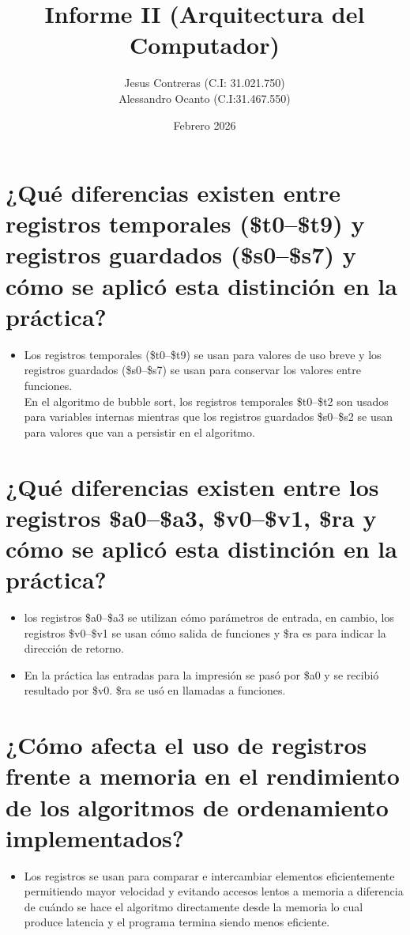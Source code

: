 \documentclass[12pt]{article}
\title{Informe II (Arquitectura del Computador)}
\author{Jesus Contreras (C.I: 31.021.750)\\Alessandro Ocanto (C.I:31.467.550)}
\date{Febrero 2026}
\begin{document}
\maketitle

\section{¿Qué diferencias existen entre registros temporales (\$t0--\$t9) y registros guardados (\$s0--\$s7) y cómo se aplicó esta distinción en la práctica?}
\begin{itemize}
    \item Los registros temporales (\$t0--\$t9) se usan para valores de uso breve y los registros guardados (\$s0--\$s7) se usan para conservar los valores entre funciones.
    \\En el algoritmo de bubble sort, los registros temporales \$t0--\$t2 son usados para variables internas mientras que los registros guardados \$s0--\$s2 se usan para valores que van a persistir en el algoritmo.
\end{itemize}

\section{¿Qué diferencias existen entre los registros \$a0–\$a3, \$v0–\$v1, \$ra y cómo se aplicó esta distinción en la práctica?}

\begin{itemize}
     \item los registros \$a0--\$a3 se utilizan cómo parámetros de entrada, en cambio, los registros \$v0--\$v1 se usan cómo salida de funciones y \$ra es para indicar la dirección de retorno.\\ 
   
   \item En la práctica las entradas para la impresión se pasó por \$a0 y se recibió resultado por \$v0. \$ra se usó en llamadas a funciones.
\end{itemize}

\section {¿Cómo afecta el uso de registros frente a memoria en el rendimiento de los algoritmos 
de ordenamiento implementados?}
\begin{itemize}
    \item Los registros se usan para comparar e intercambiar elementos eficientemente permitiendo mayor velocidad y evitando accesos lentos a memoria a diferencia de cuándo se hace el algoritmo directamente desde la memoria lo cual produce latencia y el programa termina siendo menos eficiente.
\end{itemize}
\end{document}

